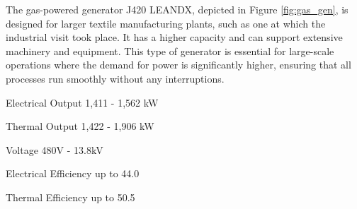 The gas-powered generator J420 LEANDX, depicted in Figure \ref{fig:gas_gen}, is designed for larger textile manufacturing plants, such as one at which the industrial visit took place. It has a higher capacity and can support extensive machinery and equipment. This type of generator is essential for large-scale operations where the demand for power is significantly higher, ensuring that all processes run smoothly without any interruptions.

Electrical Output
1,411 - 1,562 kW

Thermal Output
1,422 - 1,906 kW

Voltage
480V - 13.8kV

Electrical Efficiency
up to 44.0 %

Thermal Efficiency
up to 50.5 %